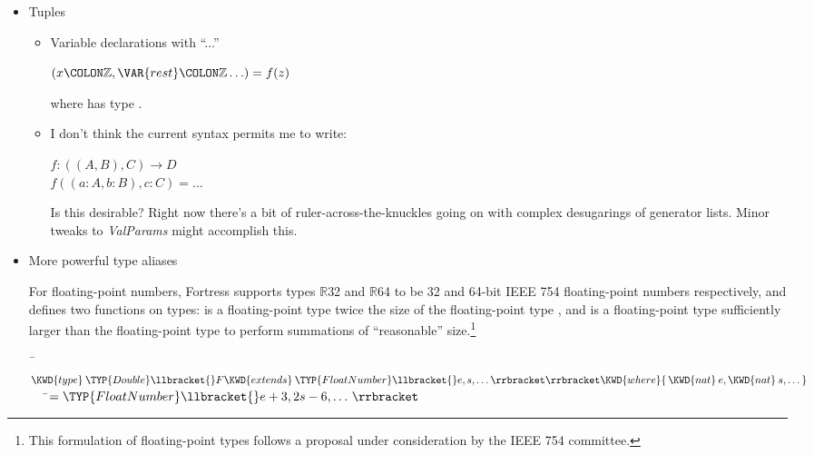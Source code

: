 \begin{itemize}
\item Tuples
\begin{itemize}
\item Variable declarations with ``...''

\begin{Fortress}
\((x\COLON \mathbb{Z}, \VAR{rest}\COLON \mathbb{Z}\ldots) = f(z)\)
\end{Fortress}
where  has type %
.

\item I don't think the current syntax permits me to write:

\begin{Fortress}
\(f \mathrel{\mathtt{:}} ((A,B),C) \rightarrow D\)\\
\(f((a \mathrel{\mathtt{:}} A, b \mathrel{\mathtt{:}} B), c \mathrel{\mathtt{:}} C) = \ldots\)
\end{Fortress}

Is this desirable? Right now there's a bit of ruler-across-the-knuckles
going on with complex desugarings of generator lists. Minor tweaks to
\emph{ValParams} might accomplish this.
\end{itemize}

\item More powerful type aliases

For floating-point numbers, Fortress supports types {$\mathbb{R}$32} and
{$\mathbb{R}$64}
to be 32 and 64-bit IEEE 754 floating-point numbers respectively,
and defines two functions on types:
 is a floating-point type twice the size of the
floating-point type , and  is a
floating-point
type sufficiently larger than the floating-point type  to
perform summations of ``reasonable'' size.\footnote{
This formulation of floating-point types follows a proposal under
consideration by the IEEE 754 committee.}

\begin{Fortress}
{\tt~}\pushtabs\=\+\( \KWD{type}\:\TYP{Double}\llbracket{}F \KWD{extends}\:\TYP{FloatNumber}\llbracket{}e, s, \ldots\rrbracket\rrbracket \KWD{where} \{\,\KWD{nat}\:e, \KWD{nat}\:s, \ldots\,\}\)\\
{\tt~~~}\pushtabs\=\+\(    = \TYP{FloatNumber}\llbracket{}e+3, 2 s - 6, \ldots\,\rrbracket\)\-\-\\\poptabs\poptabs
\end{Fortress}

\end{itemize}

